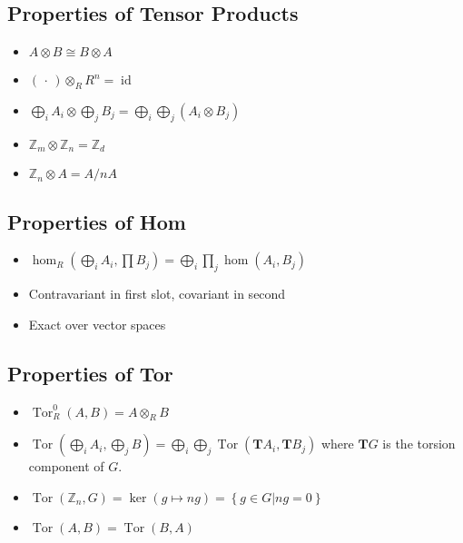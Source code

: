 \hypertarget{properties-of-tensor-products}{%
\subsection{Properties of Tensor
Products}\label{properties-of-tensor-products}}

\begin{itemize}
\tightlist
\item
  \(A\otimes B \cong B\otimes A\)
\item
  \(({\,\cdot\,}) \otimes_R R^n = \operatorname{id}\)
\item
  \(\bigoplus_i A_i \otimes\bigoplus_j B_j = \bigoplus_i\bigoplus_j(A_i \otimes B_j)\)
\item
  \({\mathbb{Z}}_m \otimes{\mathbb{Z}}_n = {\mathbb{Z}}_d\)
\item
  \({\mathbb{Z}}_n \otimes A = A/nA\)
\end{itemize}

\hypertarget{properties-of-hom}{%
\subsection{Properties of Hom}\label{properties-of-hom}}

\begin{itemize}
\tightlist
\item
  \(\hom_R (\bigoplus_i A_i, \prod B_j) = \bigoplus_i \prod_j \hom(A_i, B_j)\)
\item
  Contravariant in first slot, covariant in second
\item
  Exact over vector spaces
\end{itemize}

\hypertarget{properties-of-tor}{%
\subsection{Properties of Tor}\label{properties-of-tor}}

\begin{itemize}
\tightlist
\item
  \(\operatorname{Tor}_R^0(A, B) = A \otimes_R B\)
\item
  \(\operatorname{Tor}(\bigoplus_i A_i, \bigoplus_j B) = \bigoplus_i \bigoplus_j \operatorname{Tor}(\mathbf{T}A_i, \mathbf{T}B_j)\)
  where \(\mathbf{T}G\) is the torsion component of \(G\).
\item
  \(\operatorname{Tor}({\mathbb{Z}}_n, G) = \ker (g \mapsto ng) = \left\{{g\in G\mathrel{\Big|}ng = 0}\right\}\)
\item
  \(\operatorname{Tor}(A, B) = \operatorname{Tor}(B, A)\)
\end{itemize}

